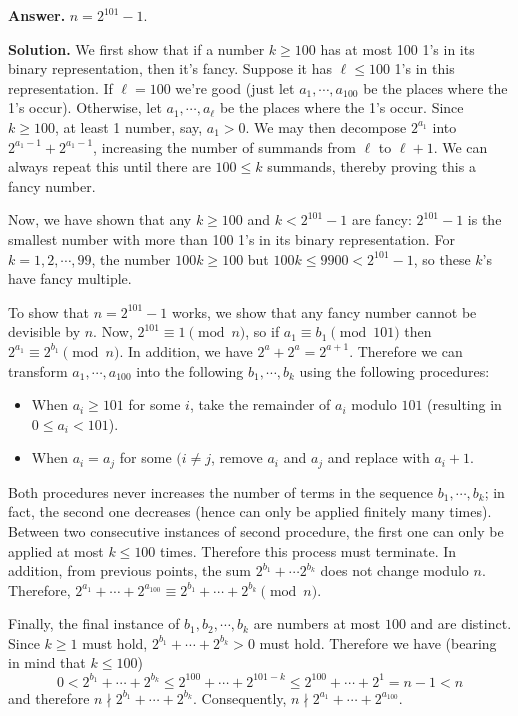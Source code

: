 \documentclass[11pt,a4paper]{article}
\begin{document}
\begin{enumerate}
	\textbf{Answer.} $n=2^{101}-1$. 
	
	\textbf{Solution.} We first show that if a number $k\ge 100$ has at most 100 1's in its binary representation, then it's fancy. Suppose it has $\ell\le 100$ 1's in this representation. If $\ell=100$ we're good (just let $a_1, \cdots , a_{100}$ be the places where the 1's occur). Otherwise, let $a_1, \cdots , a_{\ell}$ be the places where the 1's occur. Since $k\ge 100$, at least 1 number, say, $a_1>0$. We may then decompose $2^{a_1}$ into $2^{a_1-1}+2^{a_1-1}$, increasing the number of summands from $\ell$ to $\ell+1$. We can always repeat this until there are $100\le k$ summands, thereby proving this a fancy number. 
	
	Now, we have shown that any $k\ge 100$ and $k < 2^{101}-1$ are fancy: $ 2^{101}-1$ is the smallest number with more than 100 1's in its binary representation. For $k=1, 2, \cdots , 99$, the number $100k\ge 100$ but $100k\le 9900 < 2^{101}-1$, so these $k$'s have fancy multiple. 
	
	To show that $n=2^{101}-1$ works, we show that any fancy number cannot be devisible by $n$. Now, $2^{101}\equiv 1\pmod{n}$, so if $a_1\equiv b_1\pmod{101}$ then $2^{a_1}\equiv 2^{b_1}\pmod{n}$. In addition, we have $2^a+2^a=2^{a+1}$. Therefore we can transform $a_1, \cdots , a_{100}$ into the following $b_1, \cdots , b_k$ using the following procedures: 
	\begin{itemize}
		\item When $a_i\ge 101$ for some $i$, take the remainder of $a_i$ modulo $101$ (resulting in $0\le a_i<101$). 
		\item When $a_i=a_j$ for some $(i\neq j$, remove $a_i$ and $a_j$ and replace with $a_{i}+1$. 
	\end{itemize}
	Both procedures never increases the number of terms in the sequence $b_1, \cdots , b_k$; in fact, the second one decreases (hence can only be applied finitely many times). Between two consecutive instances of second procedure, the first one can only be applied at most $k\le 100$ times. Therefore this process must terminate. In addition, from previous points, the sum $2^{b_1}+\cdots 2^{b_k}$ does not change modulo $n$. Therefore, $2^{a_1}+\cdots + 2^{a_{100}}\equiv 2^{b_1}+\cdots + 2^{b_k}\pmod{n}$. 
	
	Finally, the final instance of $b_1, b_2, \cdots , b_k$ are numbers at most $100$ and are distinct. Since $k\ge 1$ must hold, $2^{b_1}+\cdots + 2^{b_k}>0$ must hold. Therefore we have (bearing in mind that $k\le 100$) 
	\[
	0<2^{b_1}+\cdots + 2^{b_k} \le 2^{100}+\cdots + 2^{101-k}\le 2^{100}+\cdots + 2^{1} = n - 1< n
	\]
	and therefore $n\nmid 2^{b_1}+\cdots + 2^{b_k}$. Consequently, $n\nmid 2^{a_1}+\cdots + 2^{a_{100}}$. 
	

\end{enumerate}
\end{document}
